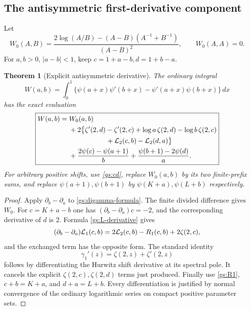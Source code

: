 \documentclass[11pt,letterpaper]{article}
\numberwithin{equation}{section}
\newtheorem{theorem}{Theorem}[section]
\theoremstyle{definition}
\theoremstyle{remark}
\begin{document}
\subsection{The antisymmetric first-derivative component}

Let
\begin{equation}\label{gs:W0}
 W_0(A,B)=
 \frac{2\log(A/B)-(A-B)(A^{-1}+B^{-1})}{(A-B)^2},
 \qquad W_0(A,A)=0.
\end{equation}
For $a,b>0$, $|a-b|<1$, keep $c=1+a-b,d=1+b-a$.

\begin{theorem}[Explicit antisymmetric derivative]
\label{gs:Wronskian}
The ordinary integral
\[
 W(a,b)=\int_0^1
 \{\psi(a+x)\psi'(b+x)-\psi'(a+x)\psi(b+x)\}\,dx
\]
has the exact evaluation
\begin{align}
 \boxed{\begin{aligned}
 W(a,b)={}&W_0(a,b)\\
 &+2\bigl\{\zeta'(2,d)-\zeta'(2,c)
       +\log a\,\zeta(2,d)-\log b\,\zeta(2,c)\\
 &\hspace{19mm}+\gsL_2(c,b)-\gsL_2(d,a)\bigr\}\\
 &+\frac{2\psi(c)-\psi(a+1)}b
       +\frac{\psi(b+1)-2\psi(d)}a.
 \end{aligned}}
 \label{gs:Wronskian-formula}
\end{align}
For arbitrary positive shifts, use \eqref{gs:cd}, replace $W_0(a,b)$
by its two finite-prefix sums, and replace $\psi(a+1),\psi(b+1)$
by $\psi(K+a),\psi(L+b)$ respectively.
\end{theorem}

\begin{proof}
Apply $\partial_b-\partial_a$ to \eqref{gs:digamma-formula}.
The finite divided difference gives $W_0$.
For $c=K+a-b$ one has
$(\partial_b-\partial_a)c=-2$, and the corresponding derivative
of $d$ is $2$.  Formula \eqref{gs:L-derivative} gives
\[
 (\partial_b-\partial_a)\mathcal L_1(c,b)
 =2\mathcal L_2(c,b)-R_1(c,b)+2\zeta(2,c),
\]
and the exchanged term has the opposite form.  The standard identity
\[
 \gamma_1'(z)=\zeta(2,z)+\zeta'(2,z)
\]
follows by differentiating the Hurwitz shift derivative at its spectral
pole.  It cancels the explicit $\zeta(2,c),\zeta(2,d)$ terms just
produced.  Finally use \eqref{gs:R1}, $c+b=K+a$, and $d+a=L+b$.
Every differentiation is justified by normal convergence of the
ordinary logarithmic series on compact positive parameter sets.
\end{proof}
\end{document}
